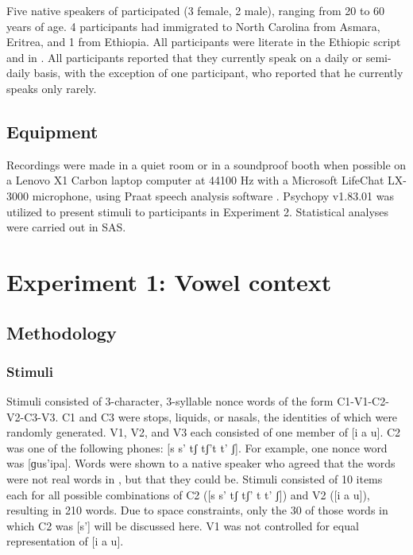 \documentclass[output=paper
,newtxmath
,modfonts
,nonflat]{langsci/langscibook}
\begin{document}
Five native speakers of  participated (3 female, 2 male), ranging from 20 to 60 years of age. 4 participants had immigrated to North Carolina from Asmara, Eritrea, and 1 from Ethiopia. All participants were literate in the Ethiopic script and in . All participants reported that they currently speak  on a daily or semi-daily basis, with the exception of one participant, who reported that he currently speaks  only rarely.

\subsection{Equipment}\label{sec:moeng:4.2}

Recordings were made in a quiet room or in a soundproof booth when possible on a Lenovo X1 Carbon laptop computer at 44100 Hz with a Microsoft LifeChat LX-3000 microphone, using Praat speech analysis software \citep{boersma2013praat}. Psychopy v1.83.01 \citep{peirce2007psychopy} was utilized to present stimuli to participants in Experiment 2. Statistical analyses were carried out in SAS.

\section{Experiment 1: Vowel context}\label{sec:moeng:5}

\subsection{Methodology}\label{sec:moeng:5.1}
\subsubsection{Stimuli}\label{sec:moeng:5.1.1}

Stimuli consisted of 3-character, 3-syllable nonce words of the form C1-V1-C2-V2-C3-V3. C1 and C3 were stops, liquids, or nasals, the identities of which were randomly generated. V1, V2, and V3 each consisted of one member of [i a u]. C2 was one of the following phones: [s s’ tʃ tʃ’t t’ ʃ]. For example, one nonce word was  [ɡus’ipa]. Words were shown to a native speaker who agreed that the words were not real words in , but that they could be. Stimuli consisted of 10 items each for all possible combinations of C2 ([s s’ tʃ tʃ’ t t’ ʃ]) and V2 ([i a u]), resulting in 210 words. Due to space constraints, only the 30 of those words in which C2 was [s’] will be discussed here. V1 was not controlled for equal representation of [i a u].
\end{document}
